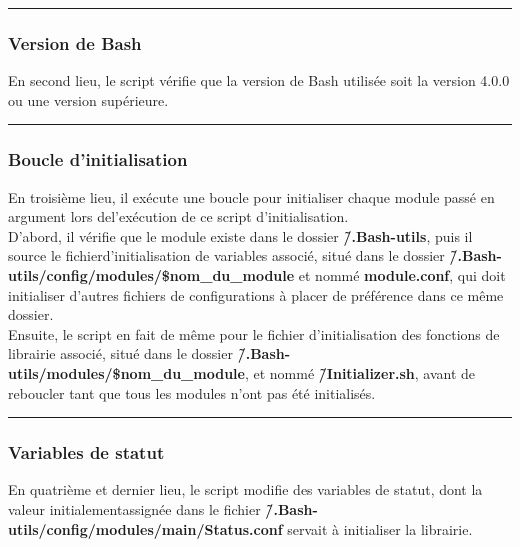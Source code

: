 \documentclass[a4paper,10pt]{article}
\begin{document}
\color{blue}\par\noindent\rule{\textwidth}{0.4pt}\color{white}

\color{blue}
\subsubsection{Version de Bash}\color{white}
En second lieu, le script vérifie que la version de Bash utilisée soit la version 4.0.0 ou une version supérieure.\\[1\baselineskip]



\color{blue}\par\noindent\rule{\textwidth}{0.4pt}\color{white}

\color{blue}
\subsubsection{Boucle d'initialisation}\color{white}
En troisième lieu, il exécute une boucle pour initialiser chaque module passé en argument lors de\linebreak l'exécution de ce script d'initialisation.\\[1\baselineskip]

D'abord, il vérifie que le module existe dans le dossier \textbf{\color{lime}\~/.Bash-utils\color{white}}, puis il source le fichier\linebreak d'initialisation de variables associé, situé dans le dossier \textbf{\color{lime}\~/.Bash-utils/config/modules/\$nom\_du\_module\color{white}} et nommé \textbf{\color{lime}module.conf\color{white}}, qui doit initialiser d'autres fichiers de configurations à placer de préférence dans ce même dossier.\\[1\baselineskip]

Ensuite, le script en fait de même pour le fichier d'initialisation des fonctions de librairie associé, situé dans le dossier \textbf{\color{lime}\~/.Bash-utils/modules/\$nom\_du\_module\color{white}}, et nommé \textbf{\color{lime}\~/Initializer.sh\color{white}}, avant de reboucler tant que tous les modules n'ont pas été initialisés.\\[1\baselineskip]



\color{blue}\par\noindent\rule{\textwidth}{0.4pt}\color{white}

\color{blue}
\subsubsection{Variables de statut}\color{white}
En quatrième et dernier lieu, le script modifie des variables de statut, dont la valeur initialement\linebreak assignée dans le fichier \textbf{\color{lime}\~/.Bash-utils/config/modules/main/Status.conf\color{white}} servait à initialiser la librairie.\\[1\baselineskip]
\end{document}
